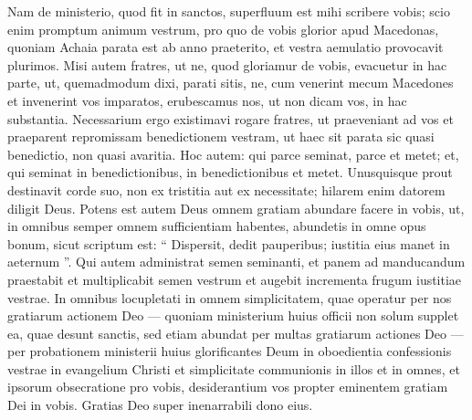 \begin{biblechapter}
\begin{biblechapter}
\begin{biblechapter}
\begin{biblechapter}
\begin{biblechapter}
\begin{biblechapter}
\begin{biblechapter}
\begin{biblechapter}
\begin{biblechapter}
\verse Nam de ministerio, quod fit in sanctos, superfluum est mihi scribere vobis; 
\verse scio enim promptum animum vestrum, pro quo de vobis glorior apud Macedonas, quoniam Achaia parata est ab anno praeterito, et vestra aemulatio provocavit plurimos. 
\verse Misi autem fratres, ut ne, quod gloriamur de vobis, evacuetur in hac parte, ut, quemadmodum dixi, parati sitis, 
\verse ne, cum venerint mecum Macedones et invenerint vos imparatos, erubescamus nos, ut non dicam vos, in hac substantia. 
\verse Necessarium ergo existimavi rogare fratres, ut praeveniant ad vos et praeparent repromissam benedictionem vestram, ut haec sit parata sic quasi benedictio, non quasi avaritia.
 \verse Hoc autem: qui parce seminat, parce et metet; et, qui seminat in benedictionibus, in benedictionibus et metet. 
\verse Unusquisque prout destinavit corde suo, non ex tristitia aut ex necessitate; hilarem enim datorem diligit Deus. 
\verse Potens est autem Deus omnem gratiam abundare facere in vobis, ut, in omnibus semper omnem sufficientiam habentes, abundetis in omne opus bonum, 
\verse sicut scriptum est:
 “ Dispersit, dedit pauperibus;
 iustitia eius manet in aeternum ”.
 \verse Qui autem administrat semen seminanti, et panem ad manducandum praestabit et multiplicabit semen vestrum et augebit incrementa frugum iustitiae vestrae. 
 \verse In omnibus locupletati in omnem simplicitatem, quae operatur per nos gratiarum actionem Deo 
\verse — quoniam ministerium huius officii non solum supplet ea, quae desunt sanctis, sed etiam abundat per multas gratiarum actiones Deo — 
\verse per probationem ministerii huius glorificantes Deum in oboedientia confessionis vestrae in evangelium Christi et simplicitate communionis in illos et in omnes, 
\verse et ipsorum obsecratione pro vobis, desiderantium vos propter eminentem gratiam Dei in vobis. 
\verse Gratias Deo super inenarrabili dono eius.
 

\end{biblechapter}
\end{biblechapter}
\end{biblechapter}
\end{biblechapter}
\end{biblechapter}
\end{biblechapter}
\end{biblechapter}
\end{biblechapter}
\end{biblechapter}

